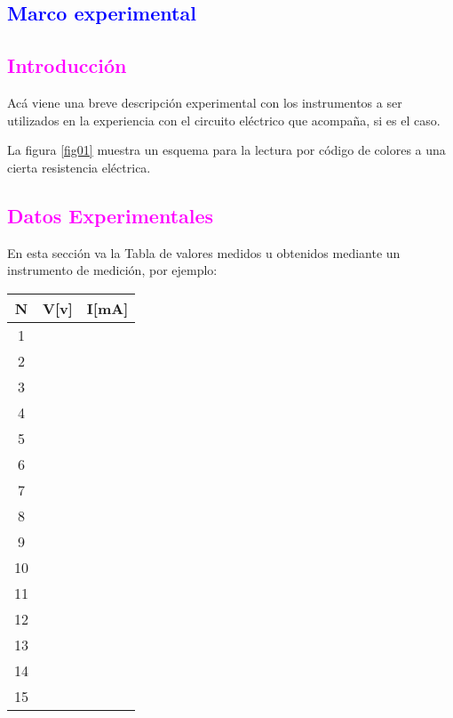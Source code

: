 \documentclass[11pt]{article}
\begin{document}
\begin{multicols}{2}
\section{\textbf{\textcolor{blue}{Marco experimental}}}
\subsection{\textbf{\textcolor{magenta}{Introducción}}}
\noindent Acá viene una breve descripción experimental con los instrumentos a ser utilizados en la experiencia con el circuito eléctrico que acompaña, si es el caso.
\begin{center}
\end{center}
\noindent La figura \ref{fig01} muestra un esquema para la lectura por código de colores a una cierta resistencia eléctrica.
\subsection{\textbf{\textcolor{magenta}{Datos Experimentales}}}
\noindent En esta sección va la Tabla de valores medidos u obtenidos mediante un instrumento de medición, por ejemplo:

\begin{center}
  \begin{tabular}{|c||c|c|}   \hline
 N&V[v] & I[mA] \\[0,1cm] 
            \hline \hline
            1 & & \\ \hline
            2 & &  \\ \hline
            3 & &  \\ \hline
            4 & &  \\ \hline
            5 & &  \\ \hline
            6 & &  \\ \hline
            7 & &  \\ \hline
            8 & &  \\ \hline
            9 & &  \\ \hline
            10& &  \\ \hline
            11& &  \\ \hline
            12& &  \\ \hline
            13& &  \\ \hline
            14& &  \\ \hline
            15& &  \\ \hline
\end{tabular}
 \end{center}

\end{multicols}
\end{document}
